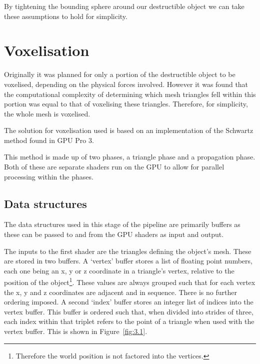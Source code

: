 By tightening the bounding sphere around our destructible object we can take these assumptions to hold for simplicity.

\section{Voxelisation}

Originally it was planned for only a portion of the destructible object to be voxelised, depending on the physical forces involved. However it was found that the computational complexity of determining which mesh triangles fell within this portion was equal to that of voxelising these triangles. Therefore, for simplicity, the whole mesh is voxelised.

The solution for voxelisation used is based on an implementation of the Schwartz method found in GPU Pro 3\cite{Schwarz:2010:Vox}\cite{Engel:2012:GPA:2331213}.

This method is made up of two phases, a triangle phase and a propagation phase. Both of these are separate shaders run on the GPU to allow for parallel processing within the phases.

\subsection{Data structures}

The data structures used in this stage of the pipeline are primarily buffers as these can be passed to and from the GPU shaders as input and output.

The inputs to the first shader are the triangles defining the object's mesh. These are stored in two buffers. A `vertex' buffer stores a list of floating point numbers, each one being an x, y or z coordinate in a triangle's vertex, relative to the position of the object\footnote{Therefore the world position is not factored into the vertices.}. These values are always grouped such that for each vertex the x, y and z coordinates are adjacent and in sequence. There is no further ordering imposed. A second `index' buffer stores an integer list of indices into the vertex buffer. This buffer is ordered such that, when divided into strides of three, each index within that triplet refers to the point of a triangle when used with the vertex buffer. This is shown in Figure~\ref{fig:3.1}.

